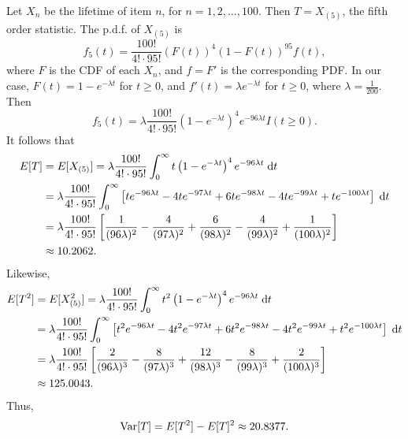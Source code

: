 \documentclass{homework}
\begin{document}
	Let $X_n$ be the lifetime of item $n$, for $n =1,2,\dots, 100$. Then $T = X_{(5)}$, the fifth order statistic. The p.d.f. of $X_{(5)}$ is
	\begin{equation*}
		f_5(t) = \frac{100!}{4!\cdot 95!}(F(t))^4(1-F(t))^95f(t),
	\end{equation*}
	where $F$ is the CDF of each $X_n$, and $f =F'$ is the corresponding PDF. In our case, $F(t) = 1-e^{-\lambda t}$ for $t \ge 0$, and $f'(t) = \lambda e^{-\lambda t}$ for $t \ge 0$, where $\lambda = \frac{1}{200}$.
	Then
	\begin{equation*}
		f_5(t) = \lambda \frac{100!}{4!\cdot 95!}\left(1-e^{-\lambda t}\right)^4  e^{-96\lambda t} I(t\ge 0).
	\end{equation*}
	It follows that
	\begin{align*}
		E[T] &= E[X_{(5)}] = \lambda\frac{100!}{4!\cdot 95!}\int_0^\infty t\left(1-e^{-\lambda t}\right)^4  e^{-96\lambda t}\;\text{d} t \\
		&= \lambda \frac{100!}{4!\cdot 95!}\int_0^\infty\left[ te^{-96\lambda t}- 4te^{-97\lambda t} + 6te^{-98\lambda t} - 4 te^{-99\lambda t} + te^{-100\lambda t}\right]\;\text{d} t\\
		&= \lambda \frac{100!}{4!\cdot 95!}\left[\frac{1}{(96\lambda)^2} - \frac{4}{(97\lambda)^2} + \frac{6}{(98\lambda)^2} - \frac{4}{(99\lambda)^2} + \frac{1}{(100\lambda)^2}\right]\\
		&\approx 10.2062.
	\end{align*}
	Likewise,
	\begin{align*}
		E[T^2] &= E[X_{(5)}^2] = \lambda\frac{100!}{4!\cdot 95!}\int_0^\infty t^2\left(1-e^{-\lambda t}\right)^4  e^{-96\lambda t}\;\text{d} t \\
		&= \lambda \frac{100!}{4!\cdot 95!}\int_0^\infty\left[ t^2e^{-96\lambda t}- 4t^2e^{-97\lambda t} + 6t^2e^{-98\lambda t} - 4 t^2e^{-99\lambda t} + t^2e^{-100\lambda t}\right]\;\text{d} t\\
		&= \lambda \frac{100!}{4!\cdot 95!}\left[\frac{2}{(96\lambda)^3} - \frac{8}{(97\lambda)^3} + \frac{12}{(98\lambda)^3} - \frac{8}{(99\lambda)^3} + \frac{2}{(100\lambda)^3}\right]\\
		&\approx 125.0043.
	\end{align*}
	Thus,
	\begin{equation*}
		\mathrm{Var}[T] = E[T^2] - E[T]^2 \approx 20.8377.
	\end{equation*}
	
\end{document}
